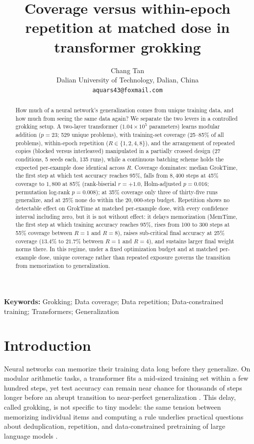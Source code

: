 \documentclass[10pt]{article}
\title{Coverage versus within-epoch repetition at matched dose in transformer grokking}
\author{Chang Tan\\
Dalian University of Technology, Dalian, China\\
\texttt{aquars43@foxmail.com}}
\begin{document}
\maketitle

\begin{abstract}
How much of a neural network's generalization comes from unique training data, and how much from seeing the same data again? We separate the two levers in a controlled grokking setup. A two-layer transformer ($1.04\times10^{5}$ parameters) learns modular addition ($p=23$; 529 unique problems), with training-set coverage (25--85\% of all problems), within-epoch repetition ($R \in \{1,2,4,8\}$), and the arrangement of repeated copies (blocked versus interleaved) manipulated in a partially crossed design (27 conditions, 5 seeds each, 135 runs), while a continuous batching scheme holds the expected per-example dose identical across $R$. Coverage dominates: median GrokTime, the first step at which test accuracy reaches 95\%, falls from $8{,}400$ steps at 45\% coverage to $1{,}800$ at 85\% (rank-biserial $r=+1.0$, Holm-adjusted $p=0.016$; permutation log-rank $p=0.008$); at 35\% coverage only three of thirty-five runs generalize, and at 25\% none do within the $20{,}000$-step budget. Repetition shows no detectable effect on GrokTime at matched per-example dose, with every confidence interval including zero, but it is not without effect: it delays memorization (MemTime, the first step at which training accuracy reaches 95\%, rises from 100 to 300 steps at 55\% coverage between $R=1$ and $R=8$), raises sub-critical final accuracy at 25\% coverage ($13.4\%$ to $21.7\%$ between $R=1$ and $R=4$), and sustains larger final weight norms there. In this regime, under a fixed optimization budget and at matched per-example dose, unique coverage rather than repeated exposure governs the transition from memorization to generalization.
\end{abstract}

\noindent\textbf{Keywords:} Grokking; Data coverage; Data repetition; Data-constrained training; Transformers; Generalization

\section{Introduction}

Neural networks can memorize their training data long before they generalize. On modular arithmetic tasks, a transformer fits a mid-sized training set within a few hundred steps, yet test accuracy can remain near chance for thousands of steps longer before an abrupt transition to near-perfect generalization \citep{power2022grokking}. This delay, called grokking, is not specific to tiny models: the same tension between memorizing individual items and computing a rule underlies practical questions about deduplication, repetition, and data-constrained pretraining of large language models \citep{lee2022deduplicating, muennighoff2023scaling, allen-zhu2024physics}.
\end{document}
